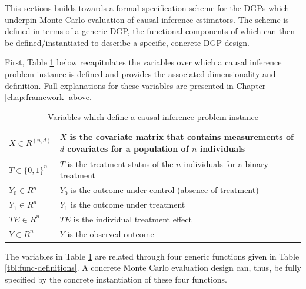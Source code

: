 \documentclass[../main.tex]{subfiles}
\begin{document}
This sections builds towards a formal specification scheme for the DGPs which underpin Monte Carlo evaluation of causal inference estimators. The scheme is defined in terms of a generic DGP, the functional components of which can then be defined/instantiated to describe a specific, concrete DGP design.\par

First, Table \ref{tbl:var-definitions} below recapitulates the variables over which a causal inference problem-instance is defined and provides the associated dimensionality and  definition. Full explanations for these variables are presented in Chapter \ref{chap:framework} above.\par

\vspace{\baselineskip}

\begin{table}[H]
\begin{tabular}{|p{1in}|p{4in}|}
\hline

$X \in R^{ \left( n, d \right) }$ & $X$ is the covariate matrix that contains measurements of $d$ covariates for a population of $n$ individuals \\ \hline

$T \in \{0, 1\}^n$ & $T$ is the treatment status of the $n$ individuals for a binary treatment \\ \hline

$Y_0 \in R^n$ & $Y_0$ is the outcome under control (absence of treatment) \\ \hline

$Y_1 \in R^n$ & $Y_1$ is the outcome under treatment \\ \hline

$TE \in R^n$ & $TE$ is the individual treatment effect \\ \hline

$Y \in R^n$ & $Y$ is the observed outcome \\ \hline
\end{tabular}

\caption{Variables which define a causal inference problem instance}
\label{tbl:var-definitions}
\end{table}

\vspace{\baselineskip}

The variables in Table \ref{tbl:var-definitions} are related through four generic functions given in Table \ref{tbl:func-definitions}. A concrete Monte Carlo evaluation design can, thus, be fully specified by the concrete instantiation of these four functions.\par
\end{document}
